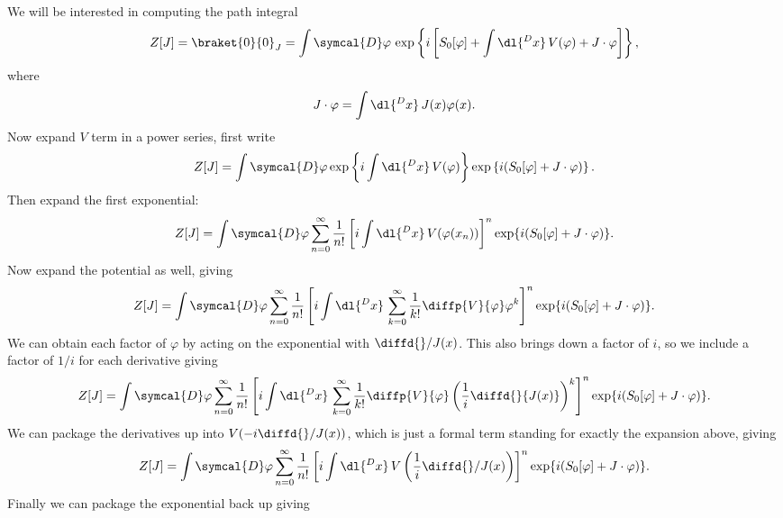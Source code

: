 \documentclass[fleqn]{NotesClass}
\newcommand{\DL}[1]{\symcal{D}#1}
\begin{document}
    We will be interested in computing the path integral
    \begin{equation}
        Z[J] = \braket{0}{0}_J = \int \DL{\varphi} \, \exp\left\{ i\left[ S_0[\varphi] + \int \dl{^Dx} \, V(\varphi) + J \cdot \varphi \right] \right\},
    \end{equation}
    where
    \begin{equation}
        J \cdot \varphi = \int \dl{^Dx} \, J(x) \varphi(x).
    \end{equation}
    Now expand \(V\) term in a power series, first write
    \begin{equation}
        Z[J] = \int \DL{\varphi} \exp\left\{ i \int \dl{^Dx} \, V(\varphi) \right\} \exp\left\{ i(S_0[\varphi] + J \cdot \varphi) \right\}.
    \end{equation}
    Then expand the first exponential:
    \begin{equation}
        Z[J] = \int \DL{\varphi} \sum_{n = 0}^{\infty} \frac{1}{n!} \left[ i\int \dl{^Dx} \, V(\varphi(x_n)) \right]^n \exp\{i(S_0[\varphi] + J \cdot \varphi)\}.
    \end{equation}
    Now expand the potential as well, giving
    \begin{equation}
        Z[J] = \int \DL{\varphi} \sum_{n = 0}^{\infty} \frac{1}{n!} \left[ i\int \dl{^Dx} \, \sum_{k=0}^{\infty} \frac{1}{k!} \diffp{V}{\varphi} \varphi^k \right]^n \exp\{i(S_0[\varphi] + J \cdot \varphi)\}.
    \end{equation}
    We can obtain each factor of \(\varphi\) by acting on the exponential with \(\diffd{}/{J(x)}\).
    This also brings down a factor of \(i\), so we include a factor of \(1/i\) for each derivative giving
    \begin{equation*}
        Z[J] = \int \DL{\varphi} \sum_{n = 0}^{\infty} \frac{1}{n!} \left[ i\int \dl{^Dx} \, \sum_{k=0}^{\infty} \frac{1}{k!} \diffp{V}{\varphi} \left( \frac{1}{i}\diffd{}{J(x)} \right)^k \right]^n \exp\{i(S_0[\varphi] + J \cdot \varphi)\}.
    \end{equation*}
    We can package the derivatives up into \(V(-i\diffd{}/{J(x)})\), which is just a formal term standing for exactly the expansion above, giving
    \begin{equation}
        Z[J] = \int \DL{\varphi} \sum_{n = 0}^{\infty} \frac{1}{n!} \left[ i\int \dl{^Dx} \, V\left( \frac{1}{i}\diffd{}/{J(x)} \right) \right]^n \exp\{i(S_0[\varphi] + J \cdot \varphi)\}.
    \end{equation}
    Finally we can package the exponential back up giving
\end{document}
